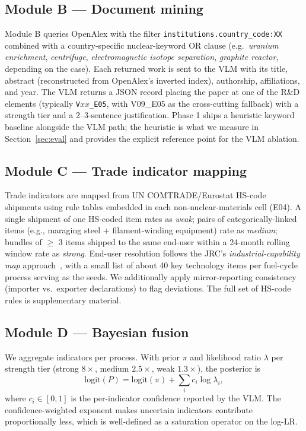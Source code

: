 \documentclass[11pt,a4paper]{article}
\newcommand{\pmcell}[1]{\texttt{#1}}
\begin{document}
\subsection{Module B --- Document mining}

Module B queries OpenAlex with the filter
\texttt{institutions.country\_code:XX} combined with a country-specific
nuclear-keyword OR clause (e.g.\ \emph{uranium enrichment},
\emph{centrifuge}, \emph{electromagnetic isotope separation},
\emph{graphite reactor}, depending on the case). Each returned work
is sent to the VLM with its title, abstract (reconstructed from
OpenAlex's inverted index), authorship, affiliations, and year. The
VLM returns a JSON record placing the paper at one of the R\&D
elements (typically \pmcell{V$xx$\_E05}, with V09\_E05 as the
cross-cutting fallback) with a strength tier and a 2--3-sentence
justification. Phase 1 ships a heuristic keyword baseline alongside
the VLM path; the heuristic is what we measure in Section~\ref{sec:eval}
and provides the explicit reference point for the VLM ablation.

\subsection{Module C --- Trade indicator mapping}

Trade indicators are mapped from UN COMTRADE/Eurostat HS-code
shipments using rule tables embedded in each non-nuclear-materials cell
(E04). A single shipment of one HS-coded item rates as
\emph{weak}; pairs of categorically-linked items (e.g., maraging steel
+ filament-winding equipment) rate as \emph{medium}; bundles of
$\geq$ 3 items shipped to the same end-user within a 24-month rolling
window rate as \emph{strong}. End-user resolution follows the JRC's
\emph{industrial-capability map} approach~\cite{Renda2014}, with a
small list of about 40 key technology items per fuel-cycle process
serving as the seeds. We additionally apply mirror-reporting consistency
(importer vs.\ exporter declarations) to flag deviations. The full
set of HS-code rules is supplementary material.

\subsection{Module D --- Bayesian fusion}\label{sec:fusion}
We aggregate indicators per process. With prior $\pi$ and likelihood
ratio $\lambda$ per strength tier (strong $8\!\times$, medium
$2.5\!\times$, weak $1.3\!\times$), the posterior is
\begin{equation}
  \mathrm{logit}(P) =
  \mathrm{logit}(\pi) + \sum_i c_i \log \lambda_i ,
  \label{eq:fusion}
\end{equation}
where $c_i \in [0,1]$ is the per-indicator confidence reported by the
VLM. The confidence-weighted exponent makes uncertain indicators
contribute proportionally less, which is well-defined as a saturation
operator on the log-LR.
\end{document}
